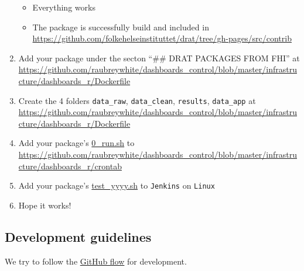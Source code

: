 \documentclass[12pt,]{article}
\providecommand{\tightlist}{%
  \setlength{\itemsep}{0pt}\setlength{\parskip}{0pt}}
\begin{document}
\begin{enumerate}
  \begin{itemize}
  \tightlist
  \item
    Everything works
  \item
    The package is successfully build and included in
    \url{https://github.com/folkehelseinstituttet/drat/tree/gh-pages/src/contrib}
  \end{itemize}
\item
  Add your package under the secton ``\#\# DRAT PACKAGES FROM FHI'' at
  \url{https://github.com/raubreywhite/dashboards_control/blob/master/infrastructure/dashboards_r/Dockerfile}
\item
  Create the 4 folders \texttt{data\_raw}, \texttt{data\_clean},
  \texttt{results}, \texttt{data\_app} at
  \url{https://github.com/raubreywhite/dashboards_control/blob/master/infrastructure/dashboards_r/Dockerfile}
\item
  Add your package's \protect\hyperlink{Runsh}{0\_run.sh} to
  \url{https://github.com/raubreywhite/dashboards_control/blob/master/infrastructure/dashboards_r/crontab}
\item
  Add your package's
  \protect\hyperlink{integrationtesting}{test\_yyyy.sh} to
  \texttt{Jenkins} on \texttt{Linux}
\item
  Hope it works!
\end{enumerate}

\subsection{Development guidelines}\label{development-guidelines}

We try to follow the
\href{https://guides.github.com/introduction/flow/}{GitHub flow} for
development.
\end{document}
